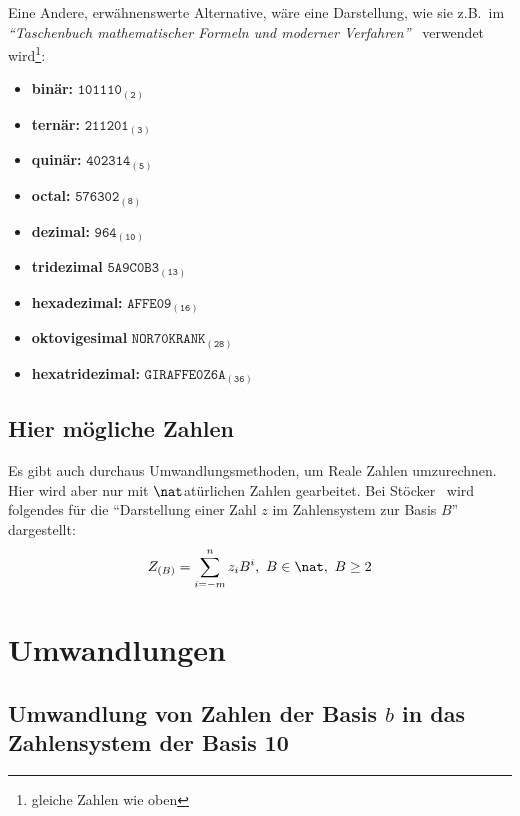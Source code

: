 \documentclass[a4paper,12pt,twoside]{book}
\begin{document}
Eine Andere, erwähnenswerte Alternative, wäre eine Darstellung, wie sie z.B.\ im \textit{"`Taschenbuch mathematischer Formeln und moderner Verfahren"'}~\cite{stocker1999taschenbuch} verwendet wird\footnote{gleiche Zahlen wie oben}: 
\begin{itemize}
	\item \textbf{binär:} $\mathtt{101110_{(2)}}$
	\item \textbf{ternär:} $\mathtt{211201_{(3)}}$
	\item \textbf{quinär:} $\mathtt{402314_{(5)}}$
	\item \textbf{octal:} $\mathtt{576302_{(8)}}$
	\item \textbf{dezimal:} $\mathtt{964_{(10)}}$
	\item \textbf{tridezimal} $\mathtt{5A9C0B3_{(13)}}$
	\item \textbf{hexadezimal:} $\mathtt{AFFE09_{(16)}}$
	\item \textbf{oktovigesimal} $\mathtt{NOR70KRANK_{(28)}}$
	\item \textbf{hexatridezimal:} $\mathtt{GIRAFFE0Z6A_{(36)}}$
\end{itemize}
\section{Hier mögliche Zahlen}
Es gibt auch durchaus Umwandlungsmethoden, um Reale Zahlen umzurechnen.
Hier wird aber nur mit $\nat$atürlichen Zahlen gearbeitet.
Bei Stöcker~\cite[Seite 4]{stocker1999taschenbuch} wird folgendes für die "`\textsf{Darstellung einer Zahl $z$ im Zahlensystem zur Basis $B$}"' dargestellt:
\[ Z_{(B)} = \sum_{i=-m}^{n} z_{i}B^{i}, \  B \in \nat, \  B \geq 2  \]

\chapter{Umwandlungen}
\section{Umwandlung von Zahlen der Basis $b$ in das Zahlensystem der Basis 10}
\end{document}
